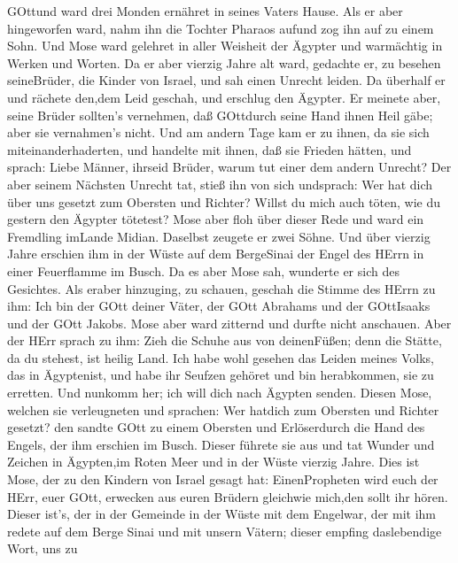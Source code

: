 GOttund ward drei Monden ernähret in seines Vaters Hause. 
Als er aber hingeworfen ward, nahm ihn die Tochter Pharaos aufund zog
ihn auf zu einem Sohn.  Und Mose ward gelehret in aller
Weisheit der Ägypter und warmächtig in Werken und Worten. 
Da er aber vierzig Jahre alt ward, gedachte er, zu besehen seineBrüder,
die Kinder von Israel,  und sah einen Unrecht leiden. Da
überhalf er und rächete den,dem Leid geschah, und erschlug den Ägypter.
 Er meinete aber, seine Brüder sollten's vernehmen, daß
GOttdurch seine Hand ihnen Heil gäbe; aber sie vernahmen's nicht.
 Und am andern Tage kam er zu ihnen, da sie sich
miteinanderhaderten, und handelte mit ihnen, daß sie Frieden hätten, und
sprach: Liebe Männer, ihrseid Brüder, warum tut einer dem andern
Unrecht?  Der aber seinem Nächsten Unrecht tat, stieß ihn
von sich undsprach: Wer hat dich über uns gesetzt zum Obersten und
Richter?  Willst du mich auch töten, wie du gestern den
Ägypter tötetest?  Mose aber floh über dieser Rede und ward
ein Fremdling imLande Midian. Daselbst zeugete er zwei Söhne.
 Und über vierzig Jahre erschien ihm in der Wüste auf dem
BergeSinai der Engel des HErrn in einer Feuerflamme im Busch.
 Da es aber Mose sah, wunderte er sich des Gesichtes. Als
eraber hinzuging, zu schauen, geschah die Stimme des HErrn zu ihm:
 Ich bin der GOtt deiner Väter, der GOtt Abrahams und der
GOttIsaaks und der GOtt Jakobs. Mose aber ward zitternd und durfte nicht
anschauen.  Aber der HErr sprach zu ihm: Zieh die Schuhe
aus von deinenFüßen; denn die Stätte, da du stehest, ist heilig Land.
 Ich habe wohl gesehen das Leiden meines Volks, das in
Ägyptenist, und habe ihr Seufzen gehöret und bin herabkommen, sie zu
erretten. Und nunkomm her; ich will dich nach Ägypten senden.
 Diesen Mose, welchen sie verleugneten und sprachen: Wer
hatdich zum Obersten und Richter gesetzt? den sandte GOtt zu einem
Obersten und Erlöserdurch die Hand des Engels, der ihm erschien im
Busch.  Dieser führete sie aus und tat Wunder und Zeichen
in Ägypten,im Roten Meer und in der Wüste vierzig Jahre. 
Dies ist Mose, der zu den Kindern von Israel gesagt hat: EinenPropheten
wird euch der HErr, euer GOtt, erwecken aus euren Brüdern gleichwie
mich,den sollt ihr hören.  Dieser ist's, der in der
Gemeinde in der Wüste mit dem Engelwar, der mit ihm redete auf dem Berge
Sinai und mit unsern Vätern; dieser empfing daslebendige Wort, uns zu

